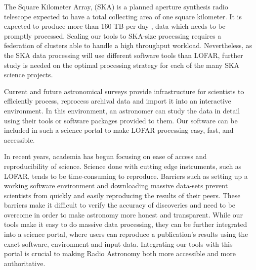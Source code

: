 The Square Kilometer Array, (SKA) is a planned aperture synthesis radio telescope expected to have a total collecting area of one square kilometer. It is expected to produce more than 160 TB per day \citep{johnston2017taming}, data which needs to be promptly processed. Scaling our tools to SKA-size processing requires a federation of clusters able to handle a high throughput workload. Nevertheless, as the SKA data processing will use different software tools than LOFAR, further study is needed on the optimal processing strategy for each of the many SKA science projects.

Current and future astronomical surveys provide infrastructure for scientists to efficiently process, reprocess archival data and import it into an interactive environment. In this environment, an astronomer can study the data in detail using their tools or software packages provided to them. Our software can be included in such a science portal to make LOFAR processing easy, fast, and accessible.

In recent years, academia has begun focusing on ease of access and reproducibility of science. Science done with cutting edge instruments, such as LOFAR, tends to be time-consuming to reproduce. Barriers such as setting up a working software environment and downloading massive data-sets prevent scientists from quickly and easily reproducing the results of their peers. These barriers make it difficult to verify the accuracy of discoveries and need to be overcome in order to make astronomy more honest and transparent. While our tools make it easy to do massive data processing, they can be further integrated into a science portal, where users can reproduce a publication's results using the exact software, environment and input data. Integrating our tools with this portal is crucial to making Radio Astronomy both more accessible and more authoritative.
